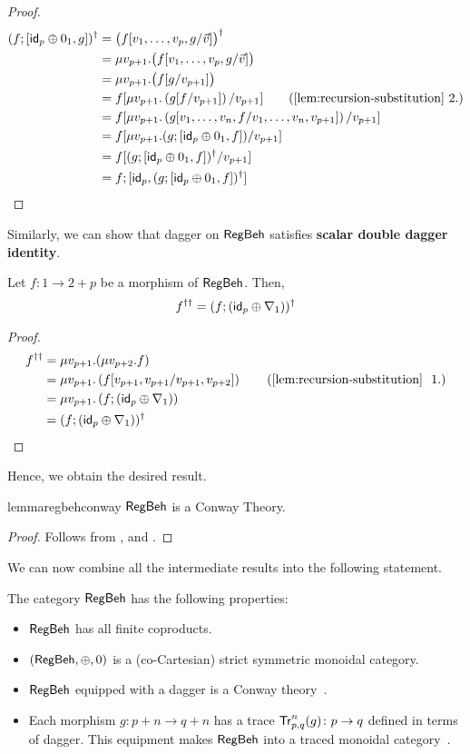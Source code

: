 \begin{proof}
\begin{align*}
(f ; \lc  \id_p \oplus 0_1 , g \rc)^\dagger & = \big(f[v_1,\dots,v_p, g/\vec{v}]\big)^\dagger	
\\
& = \mu v_{p+1}.\big(f[v_1,\dots,v_p, g/\vec{v}]\big)
\\
& = \mu v_{p+1}.\big(f[g/v_{p+1}]\big)
\\
& = f[\mu v_{p+1}. \left(g[f/v_{p+1}]\right)/v_{p+1}] \tag{\Cref{lem:recursion-substitution}~2.}
\\
& = f[\mu v_{p+1}. \left(g[v_1,\dots,v_n,f/v_1,\dots,v_n,v_{p+1}]\right)/v_{p+1}]\\
& = f[\mu v_{p+1}. (g ;  \lc  \id_p \oplus 0_1 , f\rc)/v_{p+1}]
\\
& = f[(g ;  \lc  \id_p \oplus 0_1 , f\rc)^\dagger/v_{p+1}]
\\
& = f ; \lc \id_p, (g ;  \lc  \id_p \oplus 0_1 , f\rc)^\dagger\rc
\end{align*}
\end{proof}
Similarly, we can show that dagger on $\mathsf{RegBeh}$ satisfies \textbf{scalar double dagger identity}. 
\begin{lemma}\label{conway3}
Let $f \colon 1 \to 2 + p$ be a morphism of $\mathsf{RegBeh}$. Then,
		$$
		f^{\dagger\dagger} = (f ; (\mathsf{id}_p\oplus \nabla_1))^\dagger
		$$
\end{lemma}
\begin{proof}
\begin{align*}
f^{\dagger\dagger} &= \mu v_{p+1}.(\mu v_{p+2}.f)
\\
& = \mu v_{p+1}. \left(f [v_{p+1}, v_{p+1} / v_{p+1}, v_{p+2}]\right) \tag{\Cref{lem:recursion-substitution}~ 1.}
\\
& = \mu v_{p+1}. \left(f;(\id_p\oplus \nabla_1)\right)
\\
& = (f ; (\id_p\oplus \nabla_1))^\dagger
\end{align*}
\end{proof}
Hence, we obtain the desired result.
\begin{restatable}{lemma}{regbehconway}\label{lem:regbehconway}
$\mathsf{RegBeh}$ is a Conway Theory.	
\end{restatable}
\begin{proof}
	Follows from ,  and .
\end{proof}
We can now combine all the intermediate results into the following statement.
\begin{theorem}
	The category $\mathsf{RegBeh}$ has the following properties:
	\begin{itemize}
		\item $\mathsf{RegBeh}$ has all finite coproducts. 
		\item $(\mathsf{RegBeh}, \oplus, 0)$ is a (co-Cartesian) strict symmetric monoidal category.
		\item $\mathsf{RegBeh}$ equipped with a dagger is a Conway theory~\cite{Esik:1999:Group}.
		\item Each morphism $g \colon p + n \to q + n$ has a trace $\mathsf{Tr}^{n}_{p,q}(g) \colon p \to q$ defined in terms of dagger. This equipment makes $\mathsf{RegBeh}$ into a traced monoidal category~\cite{Joyal:1996:Traced}. 
	\end{itemize}
\end{theorem} 
